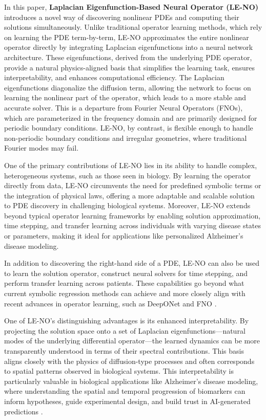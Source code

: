 \documentclass[preprint,12pt]{elsarticle}
\theoremstyle{plain}
\numberwithin{figure}{section}
\numberwithin{table}{section}
\begin{document}
In this paper, \textbf{Laplacian Eigenfunction-Based Neural Operator (LE-NO)} introduces a novel way of discovering nonlinear PDEs and computing their solutions simultaneously. Unlike traditional operator learning methods, which rely on learning the PDE term-by-term, LE-NO approximates the entire nonlinear operator directly by integrating Laplacian eigenfunctions into a neural network architecture. These eigenfunctions, derived from the underlying PDE operator, provide a natural physics-aligned basis that simplifies the learning task, ensures interpretability, and enhances computational efficiency. The Laplacian eigenfunctions diagonalize the diffusion term, allowing the network to focus on learning the nonlinear part of the operator, which leads to a more stable and accurate solver. This is a departure from Fourier Neural Operators (FNOs), which are parameterized in the frequency domain and are primarily designed for periodic boundary conditions. LE-NO, by contrast, is flexible enough to handle non-periodic boundary conditions and irregular geometries, where traditional Fourier modes may fail.

One of the primary contributions of LE-NO lies in its ability to handle complex, heterogeneous systems, such as those seen in biology. By learning the operator directly from data, LE-NO circumvents the need for predefined symbolic terms or the integration of physical laws, offering a more adaptable and scalable solution to PDE discovery in challenging biological systems. Moreover, LE-NO extends beyond typical operator learning frameworks by enabling solution approximation, time stepping, and transfer learning across individuals with varying disease states or parameters, making it ideal for applications like personalized Alzheimer’s disease modeling.

In addition to discovering the right-hand side of a PDE, LE-NO can also be used to learn the solution operator, construct neural solvers for time stepping, and perform transfer learning across patients. These capabilities go beyond what current symbolic regression methods can achieve and more closely align with recent advances in operator learning, such as DeepONet \cite{lu2019deeponet,lu2021learning} and FNO \cite{li2020fourier}. 

One of LE-NO’s distinguishing advantages is its enhanced interpretability. By projecting the solution space onto a set of Laplacian eigenfunctions—natural modes of the underlying differential operator—the learned dynamics can be more transparently understood in terms of their spectral contributions. This basis aligns closely with the physics of diffusion-type processes and often corresponds to spatial patterns observed in biological systems. This interpretability is particularly valuable in biological applications like Alzheimer’s disease modeling, where understanding the spatial and temporal progression of biomarkers can inform hypotheses, guide experimental design, and build trust in AI-generated predictions \cite{pang2023geometric}.
\end{document}
